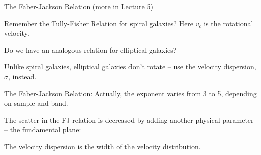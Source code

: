 \documentclass[letterpaper,landscape]{slides}
\begin{document}



\begin{slide}
\begin{center}
{\large \color{red} 
           The Faber-Jackson Relation (more in Lecture 5)}
\end{center}

Remember the Tully-Fisher Relation for spiral galaxies?
Here $v_c$ is the {\color{red} rotational} velocity. 

Do we have an analogous relation for elliptical galaxies? 

Unlike spiral galaxies, {\color{red} elliptical galaxies don't rotate} -- 
use the velocity dispersion, $\sigma$, instead.

The Faber-Jackson Relation:
Actually, the exponent varies from 3 to 5, depending on sample
and band.

The scatter in the FJ relation is decreased by adding another physical parameter --
{\color{red} the fundamental plane}:



\vfill
\end{slide}



\begin{slide}
\begin{center}
\vskip -0.1in
\end{center}

\begin{center}
\vskip -0.3in
The {\color{blue} velocity dispersion} is the width of the velocity distribution.
\end{center}

\vfill
\end{slide}
\end{document}
